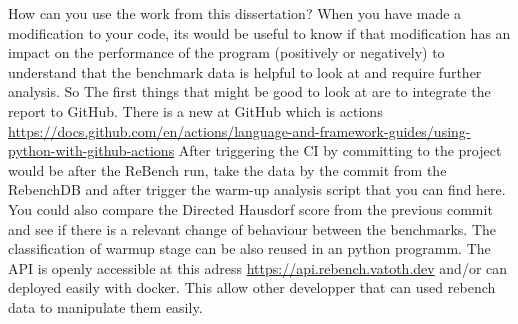 \documentclass{article}
\begin{document}
How can you use the work from this dissertation?
When you have made a modification to your code, its would be useful to know if that modification has an impact on the performance of the program (positively or negatively) to understand that the benchmark data is helpful to look at and require further analysis. So The first things that might be good to look at are to integrate the report to GitHub. There is a new  at GitHub which is  actions \url{https://docs.github.com/en/actions/language-and-framework-guides/using-python-with-github-actions}
After triggering the CI by committing to the project would be after the ReBench run, take the data by the commit from the RebenchDB and after trigger the warm-up analysis script that you can find here.
You could also compare the Directed Hausdorf score from the previous commit and see if there is a relevant change of behaviour between the benchmarks.  The classification of warmup stage can be also reused in an python programm.
The API is openly accessible at this adress \url{https://api.rebench.vatoth.dev} and/or can deployed easily with docker. This allow other developper that can used rebench data to manipulate them easily.


\end{document}
